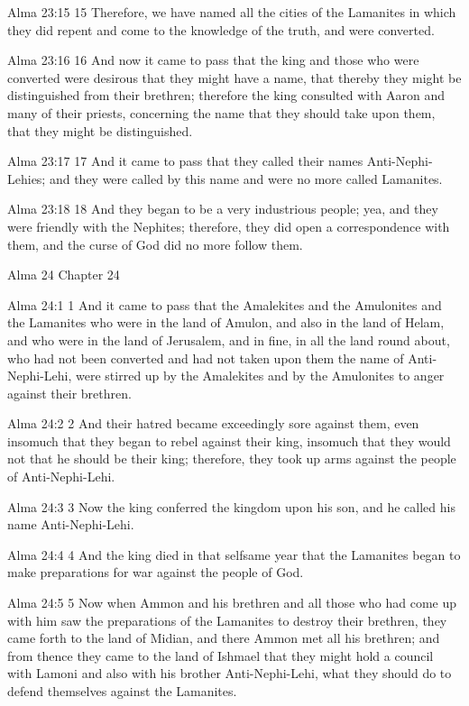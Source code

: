 Alma 23:15
 15 Therefore, we have named all the cities of the Lamanites in
which they did repent and come to the knowledge of the truth, and
were converted.

Alma 23:16
 16 And now it came to pass that the king and those who were
converted were desirous that they might have a name, that thereby
they might be distinguished from their brethren; therefore the
king consulted with Aaron and many of their priests, concerning
the name that they should take upon them, that they might be
distinguished.

Alma 23:17
 17 And it came to pass that they called their names
Anti-Nephi-Lehies; and they were called by this name and were no
more called Lamanites.

Alma 23:18
 18 And they began to be a very industrious people; yea, and they
were friendly with the Nephites; therefore, they did open a
correspondence with them, and the curse of God did no more follow
them.

Alma 24
Chapter 24

Alma 24:1
 1 And it came to pass that the Amalekites and the Amulonites and
the Lamanites who were in the land of Amulon, and also in the
land of Helam, and who were in the land of Jerusalem, and in
fine, in all the land round about, who had not been converted and
had not taken upon them the name of Anti-Nephi-Lehi, were stirred
up by the Amalekites and by the Amulonites to anger against their
brethren.

Alma 24:2
 2 And their hatred became exceedingly sore against them, even
insomuch that they began to rebel against their king, insomuch
that they would not that he should be their king; therefore, they
took up arms against the people of Anti-Nephi-Lehi.

Alma 24:3
 3 Now the king conferred the kingdom upon his son, and he called
his name Anti-Nephi-Lehi.

Alma 24:4
 4 And the king died in that selfsame year that the Lamanites
began to make preparations for war against the people of God.

Alma 24:5
 5 Now when Ammon and his brethren and all those who had come up
with him saw the preparations of the Lamanites to destroy their
brethren, they came forth to the land of Midian, and there Ammon
met all his brethren; and from thence they came to the land of
Ishmael that they might hold a council with Lamoni and also with
his brother Anti-Nephi-Lehi, what they should do to defend
themselves against the Lamanites.

